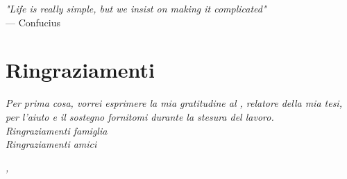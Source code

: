 
\cleardoublepage
{}
{}

\begin{flushright} {
	\slshape
	"Life is really simple, but we insist on making it complicated"
} \\
	\medskip
		--- Confucius
\end{flushright}

\begingroup
\let\clearpage\relax
\let\cleardoublepage\relax

\chapter*{Ringraziamenti}

\noindent \textit{Per prima cosa, vorrei esprimere la mia gratitudine al \statusrelatore \relatore, relatore della mia tesi, per l'aiuto e il sostegno fornitomi durante la stesura del lavoro.}\\

\noindent \textit{Ringraziamenti famiglia}\\

\noindent \textit{Ringraziamenti amici}\\

\bigskip

\noindent \textit{\luogo, \dataDiscussione}
\hfill \autore

\endgroup